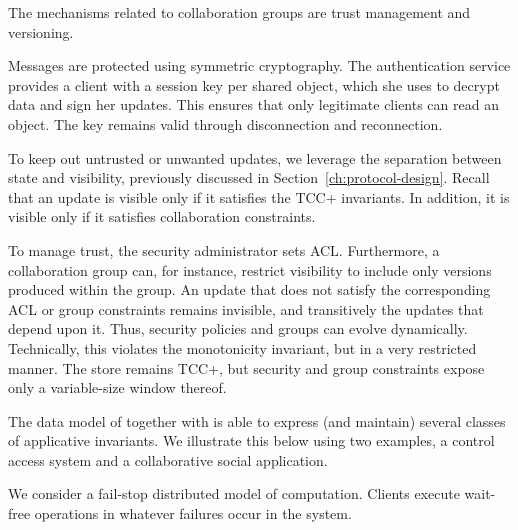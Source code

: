 The mechanisms related to collaboration groups are trust management and
versioning.

Messages are protected using symmetric cryptography.
The authentication service  provides a client with a session key
per shared object, which she uses to decrypt data and sign her updates.
This ensures that only legitimate clients can read an object.
The key remains valid through disconnection and reconnection.

To keep out untrusted or unwanted updates, we leverage the separation
between state and visibility, previously discussed in
Section~\ref{ch:protocol-design}.
Recall that an update is visible only if it satisfies the TCC+
invariants.
In addition, it is visible only if it satisfies collaboration constraints.

To manage trust, the security administrator sets ACL.
Furthermore, a collaboration group can, for instance, restrict
visibility to include only versions produced within the group.
An update that does not satisfy the corresponding ACL or group
constraints remains invisible, and transitively the updates that depend
upon it.
Thus, security policies and groups can evolve dynamically.
Technically, this violates the monotonicity invariant, but in a very
restricted manner.
The store remains TCC+, but security and group constraints expose only a
variable-size window thereof.

The data model of \system{} together with \tccp is able to express 
(and maintain) 
several classes of applicative invariants.
We illustrate this below using two examples, a control access system and a 
collaborative social application.

We consider a fail-stop distributed model of computation.
Clients execute wait-free operations in \system{} whatever failures occur in the 
system.
